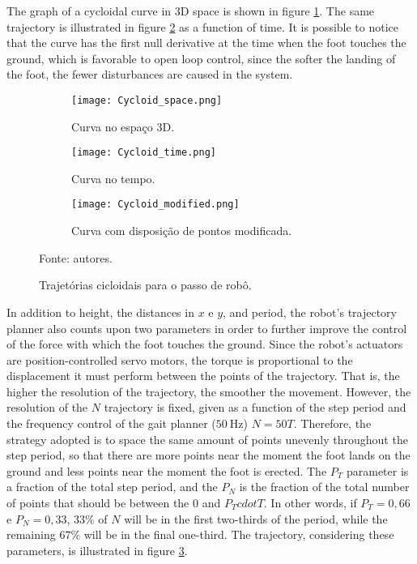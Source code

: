 \documentclass[conference]{IEEEtran}
\begin{document}
The graph of a cycloidal curve in 3D space is shown in figure \ref{fig:traj_space}. The same trajectory is illustrated in figure \ref{fig:traj_time} as a function of time. It is possible to notice that the curve has the first null derivative at the time when the foot touches the ground, which is favorable to open loop control, since the softer the landing of the foot, the fewer disturbances are caused in the system.

\begin{figure*}[h]
  \centering
  \begin{subfigure}[t]{0.32\textwidth}
    \centering
    \texttt{[image: Cycloid\_space.png]}
    \caption{Curva no espaço 3D.}
    \label{fig:traj_space}
  \end{subfigure}
  \begin{subfigure}[t]{0.32\textwidth}
    \centering
    \texttt{[image: Cycloid\_time.png]}
    \caption{Curva no tempo.}
    \label{fig:traj_time}
  \end{subfigure}
  \begin{subfigure}[t]{0.32\textwidth}
    \centering
    \texttt{[image: Cycloid\_modified.png]}
    \caption{Curva com disposição de pontos modificada.}
    \label{fig:traj_time_modified}
  \end{subfigure}
  \vfill
  \caption{Trajetórias cicloidais para o passo de robô.}
  Fonte: autores.
  \label{fig:traj_curve}
\end{figure*}
In addition to height, the distances in $x$ e $y$, and period, the robot's trajectory planner also counts upon two parameters in order to further improve the control of the force with which the foot touches the ground. Since the robot’s actuators are position-controlled servo motors, the torque is proportional to the displacement it must perform between the points of the trajectory. That is, the higher the resolution of the trajectory, the smoother the movement. However, the resolution of the $N$ trajectory is fixed, given as a function of the step period and the frequency control of the gait planner ($\SI{50}{\hertz}$) $N = 50T$. Therefore, the strategy adopted is to space the same amount of points unevenly throughout the step period, so that there are more points near the moment the foot lands on the ground and less points near the moment the foot is erected. The $P_T$ parameter is a fraction of the total step period, and the $P_N$ is the fraction of the total number of points that should be between the $0$ and $P_T cdot T$. In other words, if $P_T = 0,66$ e $P_N = 0,33$, $33\%$ of $N$ will be in the first two-thirds of the period, while the remaining $67\%$ will be in the final one-third. The trajectory, considering these parameters, is illustrated in figure \ref{fig:traj_time_modified}.
\end{document}
